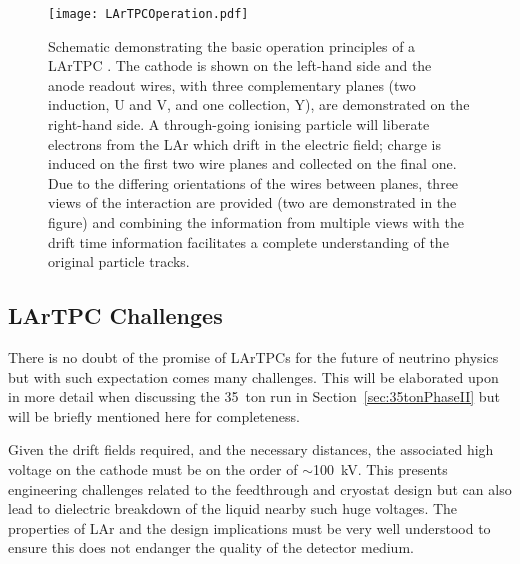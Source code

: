 \begin{figure}
  \centering
  \texttt{[image: LArTPCOperation.pdf]}
  \caption[Schematic demonstrating the basic operation principles of a LArTPC.]{Schematic demonstrating the basic operation principles of a LArTPC \cite{MicroBooNENoise2017}.  The cathode is shown on the left-hand side and the anode readout wires, with three complementary planes (two induction, U and V, and one collection, Y), are demonstrated on the right-hand side.  A through-going ionising particle will liberate electrons from the LAr which drift in the electric field; charge is induced on the first two wire planes and collected on the final one.  Due to the differing orientations of the wires between planes, three views of the interaction are provided (two are demonstrated in the figure) and combining the information from multiple views with the drift time information facilitates a complete understanding of the original particle tracks.}
  \label{fig:LArTPCOperation}
\end{figure}

\subsection{LArTPC Challenges}\label{sec:LArTPCChallenges}

There is no doubt of the promise of LArTPCs for the future of neutrino physics but with such expectation comes many challenges.  This will be elaborated upon in more detail when discussing the 35~ton run in Section~\ref{sec:35tonPhaseII} but will be briefly mentioned here for completeness.

Given the drift fields required, and the necessary distances, the associated high voltage on the cathode must be on the order of $\sim$100~kV.  This presents engineering challenges related to the feedthrough and cryostat design but can also lead to dielectric breakdown of the liquid nearby such huge voltages.  The properties of LAr and the design implications must be very well understood to ensure this does not endanger the quality of the detector medium.


